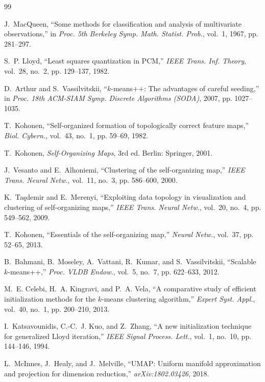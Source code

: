 \documentclass[journal]{IEEEtran}
\begin{document}

\begin{thebibliography}{99}

J.~MacQueen, ``Some methods for classification and analysis of multivariate observations,'' in \emph{Proc. 5th Berkeley Symp. Math. Statist. Prob.}, vol.~1, 1967, pp. 281--297.

S.~P. Lloyd, ``Least squares quantization in PCM,'' \emph{IEEE Trans. Inf. Theory}, vol.~28, no.~2, pp. 129--137, 1982.

D.~Arthur and S.~Vassilvitskii, ``$k$-means++: The advantages of careful seeding,'' in \emph{Proc. 18th ACM-SIAM Symp. Discrete Algorithms (SODA)}, 2007, pp. 1027--1035.

T.~Kohonen, ``Self-organized formation of topologically correct feature maps,'' \emph{Biol. Cybern.}, vol.~43, no.~1, pp. 59--69, 1982.

T.~Kohonen, \emph{Self-Organizing Maps}, 3rd ed. Berlin: Springer, 2001.

J.~Vesanto and E.~Alhoniemi, ``Clustering of the self-organizing map,'' \emph{IEEE Trans. Neural Netw.}, vol.~11, no.~3, pp. 586--600, 2000.

K.~Ta\c{s}demir and E.~Merenyi, ``Exploiting data topology in visualization and clustering of self-organizing maps,'' \emph{IEEE Trans. Neural Netw.}, vol.~20, no.~4, pp. 549--562, 2009.

T.~Kohonen, ``Essentials of the self-organizing map,'' \emph{Neural Netw.}, vol.~37, pp. 52--65, 2013.

B.~Bahmani, B.~Moseley, A.~Vattani, R.~Kumar, and S.~Vassilvitskii, ``Scalable $k$-means++,'' \emph{Proc. VLDB Endow.}, vol.~5, no.~7, pp. 622--633, 2012.

M.~E. Celebi, H.~A. Kingravi, and P.~A. Vela, ``A comparative study of efficient initialization methods for the $k$-means clustering algorithm,'' \emph{Expert Syst. Appl.}, vol.~40, no.~1, pp. 200--210, 2013.

I.~Katsavounidis, C.-C.~J. Kuo, and Z.~Zhang, ``A new initialization technique for generalized Lloyd iteration,'' \emph{IEEE Signal Process. Lett.}, vol.~1, no.~10, pp. 144--146, 1994.

L.~McInnes, J.~Healy, and J.~Melville, ``UMAP: Uniform manifold approximation and projection for dimension reduction,'' \emph{arXiv:1802.03426}, 2018.


\end{thebibliography}
\end{document}
